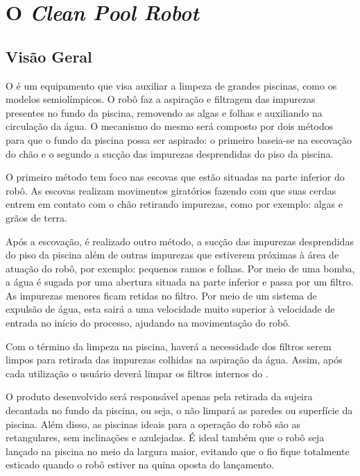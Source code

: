 \chapter{O \textit{Clean Pool Robot}} \label{ch:cpr}
\section{Visão Geral}
O \cpr é um equipamento que visa auxiliar a limpeza de grandes piscinas, como os modelos semiolímpicos. O robô faz a aspiração e filtragem das impurezas presentes no fundo da piscina, removendo as algas e folhas e auxiliando na circulação da água. O mecanismo do mesmo será composto por dois métodos para que o fundo da piscina possa ser aspirado: o primeiro baseia-se na escovação do chão e o segundo a sucção das impurezas desprendidas do piso da piscina.

O primeiro método tem foco nas escovas que estão situadas na parte inferior do robô. As escovas realizam movimentos giratórios fazendo com que suas cerdas entrem em contato com o chão retirando  impurezas, como por exemplo: algas e grãos de terra.

Após a escovação, é realizado outro método, a sucção das impurezas desprendidas do piso da piscina  além de outras impurezas que estiverem próximas à área de atuação do robô, por exemplo: pequenos ramos e folhas. Por meio de uma bomba, a água é sugada por uma abertura situada na parte inferior e passa por um filtro. As impurezas menores ficam retidas no filtro. Por meio de um sistema de expulsão de água, esta sairá a uma velocidade muito superior à velocidade de entrada no início do processo, ajudando na movimentação do robô.

Com o término da limpeza na piscina, haverá a necessidade dos filtros serem limpos para retirada das impurezas colhidas na aspiração da água. Assim, após cada utilização o usuário deverá limpar os filtros internos do \cpr.

O produto desenvolvido será responsável apenas pela retirada da sujeira decantada no fundo da piscina, ou seja, o \cpr não limpará as paredes ou superfície da piscina. Além disso, as piscinas ideais para a operação do robô são as retangulares, sem inclinações e azulejadas. É ideal também que o robô seja lançado na piscina no meio da largura maior, evitando que o fio fique totalmente esticado quando o robô estiver na quina oposta do lançamento.

